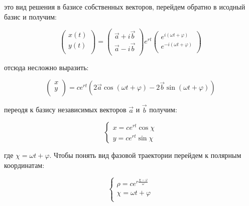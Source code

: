 \documentclass[a4paper, 12pt]{article}
\begin{document}
\begin{enumerate}
      это вид решения в базисе собственных векторов, перейдем обратно в исодный базис и получим:

      \begin{equation}
        \begin{pmatrix}
          x(t) \\
          y(t) \\
        \end{pmatrix} = 
        \begin{pmatrix}
          \vec{a} + i \vec{b} \\
          \vec{a} - i \vec{b} \\
        \end{pmatrix}
        e^{r t}
        \begin{pmatrix}
          e^{i(\omega t + \varphi)} \\
          e^{-i(\omega t + \varphi)} \\
        \end{pmatrix}
      \end{equation}

      отсюда несложно выразить:

      \begin{equation}
        \begin{pmatrix}
          x \\ 
          y \\
        \end{pmatrix} = 
        c e^{r t} (2 \vec{a} \cos (\omega t + \varphi) - 2 \vec{b} \sin (\omega t + \varphi))
      \end{equation}

      переодя к базису независимых векторов $\vec{a}$ и $\vec{b}$ получим:

      \begin{equation}
        \begin{cases}
          x = c e^{r t} \cos {\chi} \\
          y = c e^{r t} \sin {\chi}
        \end{cases}
      \end{equation}
      
      где $\chi = \omega t + \varphi$. Чтобы понять вид фазовой траектории перейдем к полярным координатам:

      \begin{equation}
        \begin{cases}
          \rho = c e^{r \frac{\chi - \varphi}{\omega}} \\
          \chi = \omega t + \varphi \\
        \end{cases}
      \end{equation}


\end{enumerate}
\end{document}
